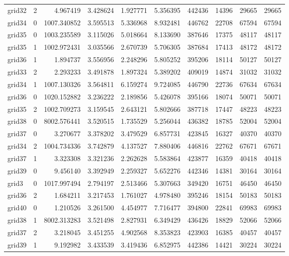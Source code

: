 \begin{longtable}{|l|r|r|r|r|r|r|r|r|r|}
grid32 & 2 & 4.967419 & 3.428624 & 1.927771 & 5.356395 & 442436 & 14396 & 29665 & 29665 \\
grid34 & 0 & 1007.340852 & 3.595513 & 5.336968 & 8.932481 & 446762 & 22708 & 67594 & 67594 \\
grid35 & 0 & 1003.235589 & 3.115026 & 5.018664 & 8.133690 & 387646 & 17375 & 48117 & 48117 \\
grid35 & 1 & 1002.972431 & 3.035566 & 2.670739 & 5.706305 & 387684 & 17413 & 48172 & 48172 \\
grid36 & 1 & 1.894737 & 3.556956 & 2.248296 & 5.805252 & 395206 & 18114 & 50127 & 50127 \\
grid33 & 2 & 2.293233 & 3.491878 & 1.897324 & 5.389202 & 409019 & 14874 & 31032 & 31032 \\
grid34 & 1 & 1007.130326 & 3.564811 & 6.159274 & 9.724085 & 446790 & 22736 & 67634 & 67634 \\
grid36 & 0 & 1020.152882 & 3.236222 & 2.189856 & 5.426078 & 395166 & 18074 & 50071 & 50071 \\
grid35 & 2 & 1002.709273 & 3.159545 & 2.643121 & 5.802666 & 387718 & 17447 & 48223 & 48223 \\
grid38 & 0 & 8002.576441 & 3.520515 & 1.735529 & 5.256044 & 436382 & 18785 & 52004 & 52004 \\
grid37 & 0 & 3.270677 & 3.378202 & 3.479529 & 6.857731 & 423845 & 16327 & 40370 & 40370 \\
grid34 & 2 & 1004.734336 & 3.742879 & 4.137527 & 7.880406 & 446816 & 22762 & 67671 & 67671 \\
grid37 & 1 & 3.323308 & 3.321236 & 2.262628 & 5.583864 & 423877 & 16359 & 40418 & 40418 \\
grid39 & 0 & 9.456140 & 3.392949 & 2.259327 & 5.652276 & 442346 & 14381 & 30164 & 30164 \\
grid3 & 0 & 1017.997494 & 2.794197 & 2.513466 & 5.307663 & 349420 & 16751 & 46450 & 46450 \\
grid36 & 2 & 1.684211 & 3.217453 & 1.761027 & 4.978480 & 395246 & 18154 & 50183 & 50183 \\
grid40 & 0 & 1.210526 & 3.261500 & 4.454977 & 7.716477 & 394800 & 22841 & 69983 & 69983 \\
grid38 & 1 & 8002.313283 & 3.521498 & 2.827931 & 6.349429 & 436426 & 18829 & 52066 & 52066 \\
grid37 & 2 & 3.218045 & 3.451255 & 4.902568 & 8.353823 & 423903 & 16385 & 40457 & 40457 \\
grid39 & 1 & 9.192982 & 3.433539 & 3.419436 & 6.852975 & 442386 & 14421 & 30224 & 30224 \\

\end{longtable}
